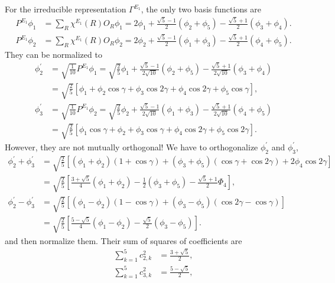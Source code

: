 		For the irreducible representation $\Gamma^{E_1}$, the only two basis functions are
		\begin{align*}
			P^{E_1}\phi_1 &= \sum_{R} \chi^{E_1}(R) O_R \phi_1 = 2\phi_1 + \frac{\sqrt{5}-1}{2}(\phi_2 + \phi_5) - \frac{\sqrt{5}+1}{2}(\phi_3 + \phi_4). \\
			P^{E_1}\phi_2 &= \sum_{R} \chi^{E_1}(R) O_R \phi_2 = 2\phi_2 + \frac{\sqrt{5}-1}{2}(\phi_1 + \phi_3) - \frac{\sqrt{5}+1}{2}(\phi_4 + \phi_5).
		\end{align*}
		They can be normalized to
		\begin{align*}
			\phi^\prime_2 &= \sqrt{\frac{1}{10}} P^{E_1}\phi_1 = \sqrt{ \frac{2}{5} }\phi_1 + \frac{\sqrt{5}-1}{2\sqrt{10}}(\phi_2+\phi_5) - \frac{\sqrt{5}+1}{2\sqrt{10}}(\phi_3+\phi_4) \\
			&= \sqrt{ \frac{2}{5} } \left[ \phi_1 + \phi_2 \cos\gamma + \phi_3\cos2\gamma + \phi_4\cos2\gamma + \phi_5\cos\gamma \right], \\
			\phi^\prime_3 &= \sqrt{\frac{1}{10}} P^{E_1}\phi_2 = \sqrt{ \frac{2}{5} }\phi_2 + \frac{\sqrt{5}-1}{2\sqrt{10}}(\phi_1+\phi_3) - \frac{\sqrt{5}+1}{2\sqrt{10}}(\phi_4+\phi_5) \\
			&= \sqrt{ \frac{2}{5} } \left[ \phi_1\cos\gamma + \phi_2  + \phi_3\cos\gamma + \phi_4\cos2\gamma + \phi_5\cos2\gamma \right].
		\end{align*}
		However, they are not mutually orthogonal! We have to orthogonalize $\phi^\prime_2$ and $\phi^\prime_3$,
		\begin{align*}
			\phi^\prime_2 + \phi^\prime_3 &= \sqrt{ \frac{2}{5} } \left[ (\phi_1+\phi_2) (1+\cos\gamma) + (\phi_3+\phi_5) (\cos\gamma + \cos 2\gamma) + 2\phi_4\cos2\gamma \right] \\
			&= \sqrt{ \frac{2}{5} } \left[ \frac{3+\sqrt{5}}{4}(\phi_1 + \phi_2) - \frac{1}{2} (\phi_3 + \phi_5) - \frac{ \sqrt{5}+1 }{2} \Phi_4 \right] , \\
			\phi^\prime_2 - \phi^\prime_3 &= \sqrt{ \frac{2}{5} } \left[ (\phi_1-\phi_2) (1-\cos\gamma) + (\phi_3-\phi_5) (\cos2\gamma - \cos\gamma) \right] \\
			&=\sqrt{ \frac{2}{5} } \left[ \frac{ 5-\sqrt{5} }{4} (\phi_1 - \phi_2) - \frac{ \sqrt{5} }{2} (\phi_3 - \phi_5) \right].
		\end{align*}
		and then normalize them. Their sum of squares of coefficients are
		\begin{align*}
			\sum_{k=1}^5 c^2_{2,k} &= \frac{3+\sqrt{5}}{2}, \\
			\sum_{k=1}^5 c^2_{3,k} &= \frac{5-\sqrt{5}}{2},
		\end{align*}
